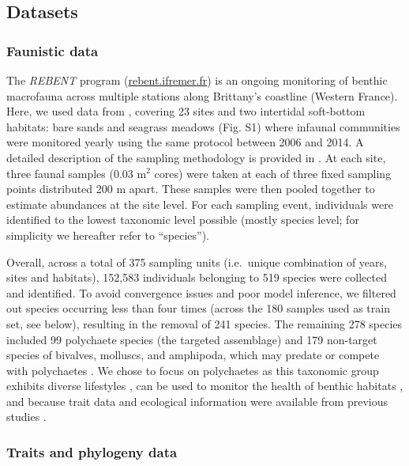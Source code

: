 \begin{refsection}
\hypertarget{datasets}{%
\subsection{Datasets}\label{datasets}}

\hypertarget{faunistic-data}{%
\subsubsection{Faunistic data}\label{faunistic-data}}

The \emph{REBENT} program
(\href{https://rebent.ifremer.fr}{rebent.ifremer.fr}) is an ongoing
monitoring of benthic macrofauna across multiple stations along
Brittany's coastline (Western France). Here, we used data from
\textcite{Boye_2019a}, covering 23 sites and two intertidal soft-bottom
habitats: bare sands and seagrass meadows (Fig. S1) where infaunal
communities were monitored yearly using the same protocol between 2006
and 2014. A detailed description of the sampling methodology is provided
in \autocites[ ]{Boye_2017}{Boye_2019a}. At each site, three faunal
samples (0.03 m\(^2\) cores) were taken at each of three fixed sampling
points distributed 200 m apart. These samples were then pooled together
to estimate abundances at the site level. For each sampling event,
individuals were identified to the lowest taxonomic level possible
(mostly species level; for simplicity we hereafter refer to
``species'').

Overall, across a total of 375 sampling units (i.e.~unique combination
of years, sites and habitats), 152,583 individuals belonging to 519
species were collected and identified. To avoid convergence issues and
poor model inference, we filtered out species occurring less than four
times (across the 180 samples used as train set, see below), resulting
in the removal of 241 species. The remaining 278 species included 99
polychaete species (the targeted assemblage) and 179 non-target species
of bivalves, molluscs, and amphipoda, which may predate or compete with
polychaetes \autocites[ ]{Grall_2006}{Jankowska_2019}. We chose to focus
on polychaetes as this taxonomic group exhibits diverse lifestyles
\autocite{Jumars_2015}, can be used to monitor the health of benthic
habitats \autocite{Giangrande_2005}, and because trait data and
ecological information were available from previous studies
\autocite{Boye_2019a}.

\hypertarget{traits-and-phylogeny-data}{%
\subsubsection{Traits and phylogeny
data}\label{traits-and-phylogeny-data}}


\end{refsection}
